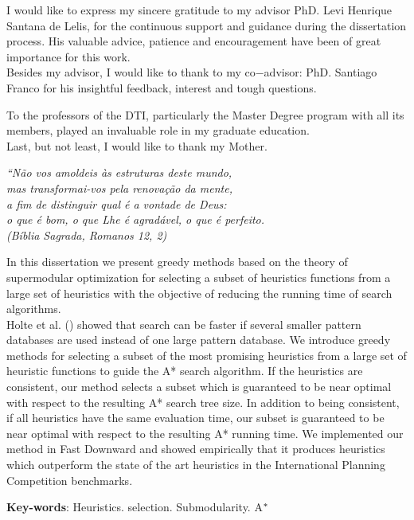 \documentclass[
	12pt,				%
	openright,		nsubseteq	%
	twoside,			%
	a4paper,			%
	english,			%
	french,				%
	spanish,			%
	brazil				%
	]{abntex2}
\begin{document}
\begin{agradecimentos}
I would like to express my sincere gratitude to my advisor PhD. Levi Henrique Santana de Lelis, for the continuous support and guidance during the dissertation process. His valuable advice, patience and encouragement have been of great
importance for this work. \\

Besides my advisor, I would like to thank to my co$-$advisor: PhD. Santiago Franco for his insightful feedback, interest and tough questions.

To the professors of the DTI, particularly the Master Degree program with all its members, played an invaluable role in my graduate education. \\

Last, but not least, I would like to thank my Mother.
\end{agradecimentos}

\begin{epigrafe}
    \vspace*{\fill}
	\begin{flushright}
		\textit{``Não vos amoldeis às estruturas deste mundo, \\
		mas transformai-vos pela renovação da mente, \\
		a fim de distinguir qual é a vontade de Deus: \\
		o que é bom, o que Lhe é agradável, o que é perfeito.\\
		(Bíblia Sagrada, Romanos 12, 2)}
	\end{flushright}
\end{epigrafe}


\setlength{\absparsep}{18pt} %
\begin{resumo}
In this dissertation we present greedy methods based on the theory of supermodular optimization for selecting a subset of heuristics functions from a large set of heuristics with the objective of reducing the running time of search algorithms. \\ 

Holte et al. (\citeyear{holte2006maximizing}) showed that search can be faster if several smaller pattern databases are used instead of one large pattern database. We introduce greedy methods for selecting a subset of the most promising heuristics from a large set of heuristic functions to guide the A* search algorithm. If the heuristics are consistent, our method selects a subset which is guaranteed to be near optimal with respect to the resulting A* search tree size. In addition to being consistent, if all heuristics have the same evaluation time, our subset is guaranteed to be near optimal with respect to the resulting A* running time. We implemented our method in Fast Downward and showed empirically that it produces heuristics which outperform the state of the art heuristics in the International Planning Competition benchmarks.

 \textbf{Key-words}: Heuristics. selection. Submodularity. A$\sp{*}$
\end{resumo}
\end{document}
